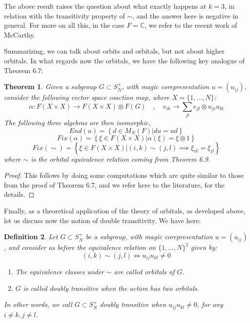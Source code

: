 \documentclass[12pt]{amsbook}
\newtheorem{theorem}{Theorem}[chapter]
\newtheorem{definition}[theorem]{Definition}
\begin{document}
The above result raises the question about what exactly happens at $k=3$, in relation with the transitivity property of $\sim$, and the answer here is negative in general. For more on all this, in the case $F=\mathbb C$, we refer to the recent work of McCarthy.

\bigskip

Summarizing, we can talk about orbits and orbitals, but not about higher orbitals. In what regards now the orbitals, we have the following key analogue of Theorem 6.7:

\begin{theorem}
Given a subgroup $G\subset S_N^+$, with magic corepresentation $u=(u_{ij})$, consider the following vector space coaction map, where $X=\{1,\ldots,N\}$:
$$\alpha:F(X\times X)\to F(X\times X)\otimes F(G)\quad,\quad e_{ik}\to\sum_{jl}e_{jl}\otimes u_{ji}u_{lk}$$
The following three algebras are then isomorphic,
$$End(u)=\left\{d\in M_N(F)\Big|du=ud\right\}$$
$$Fix(\alpha)=\left\{\xi\in F(X\times X)\Big|\alpha(\xi)=\xi\otimes1\right\}$$
$$Fix(\sim)=\left\{\xi\in F(X\times X)\Big|(i,k)\sim(j,l)\implies \xi_{ik}=\xi_{jl}\right\}$$
where $\sim$ is the orbital equivalence relation coming from Theorem 6.9.
\end{theorem}

\begin{proof}
This follows by doing some computations which are quite similar to those from the proof of Theorem 6.7, and we refer here to the literature, for the details.
\end{proof}

Finally, as a theoretical application of the theory of orbitals, as developed above, let us discuss now the notion of double transitivity. We have here:

\begin{definition}
Let $G\subset S_N^+$ be a subgroup, with magic corepresentation $u=(u_{ij})$, and consider as before the equivalence relation on $\{1,\ldots,N\}^2$ given by:
$$(i,k)\sim (j,l)\iff u_{ij}u_{kl}\neq0$$ 
\begin{enumerate}
\item The equivalence classes under $\sim$ are called orbitals of $G$.

\item $G$ is called doubly transitive when the action has two orbitals. 
\end{enumerate}
In other words, we call $G\subset S_N^+$ doubly transitive when $u_{ij}u_{kl}\neq0$, for any $i\neq k,j\neq l$.
\end{definition}
\end{document}
